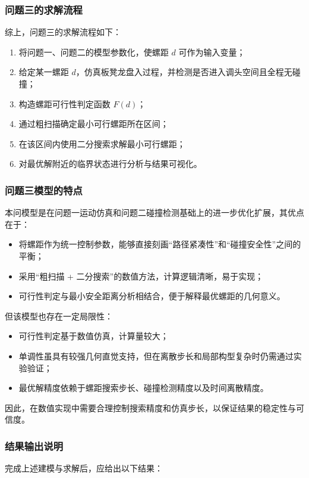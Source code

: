 \documentclass[12pt,a4paper]{ctexart}
\begin{document}
\subsubsection{问题三的求解流程}
综上，问题三的求解流程如下：

\begin{enumerate}
    \item 将问题一、问题二的模型参数化，使螺距 $d$ 可作为输入变量；
    \item 给定某一螺距 $d$，仿真板凳龙盘入过程，并检测是否进入调头空间且全程无碰撞；
    \item 构造螺距可行性判定函数 $F(d)$；
    \item 通过粗扫描确定最小可行螺距所在区间；
    \item 在该区间内使用二分搜索求解最小可行螺距；
    \item 对最优解附近的临界状态进行分析与结果可视化。
\end{enumerate}

\subsubsection{问题三模型的特点}
本问模型是在问题一运动仿真和问题二碰撞检测基础上的进一步优化扩展，其优点在于：

\begin{itemize}
    \item 将螺距作为统一控制参数，能够直接刻画“路径紧凑性”和“碰撞安全性”之间的平衡；
    \item 采用“粗扫描 + 二分搜索”的数值方法，计算逻辑清晰，易于实现；
    \item 可行性判定与最小安全距离分析相结合，便于解释最优螺距的几何意义。
\end{itemize}

但该模型也存在一定局限性：

\begin{itemize}
    \item 可行性判定基于数值仿真，计算量较大；
    \item 单调性虽具有较强几何直觉支持，但在离散步长和局部构型复杂时仍需通过实验验证；
    \item 最优解精度依赖于螺距搜索步长、碰撞检测精度以及时间离散精度。
\end{itemize}

因此，在数值实现中需要合理控制搜索精度和仿真步长，以保证结果的稳定性与可信度。

\subsubsection{结果输出说明}
完成上述建模与求解后，应给出以下结果：
\end{document}

